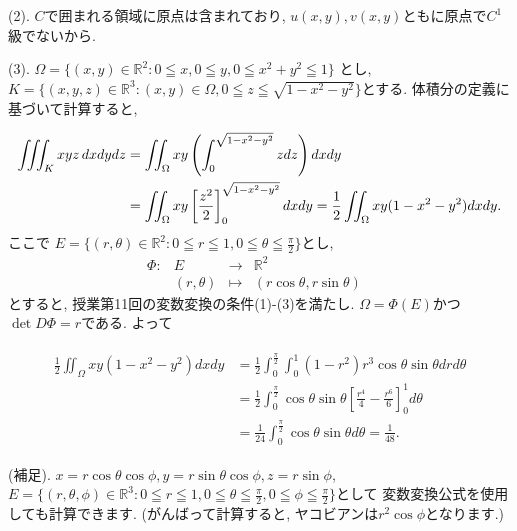 \documentclass[dvipdfmx,a4paper,11pt]{article}
\newcommand{\R}{\mathbb{R}}
\theoremstyle{definition}
\begin{document}
  (2). $C$で囲まれる領域に原点は含まれており, $u(x,y),v(x,y)$ともに原点で$C^1$級でないから. 

(3).
$\Omega= \{ (x,y) \in \R^2 : 0 \leqq x,  0 \leqq y, 
0 \leqq x^2 + y^2  \leqq 1 \}$
とし, 
$K=\{ (x,y,z) \in \R^3 : (x,y) \in \Omega,  0 \leqq z \leqq \sqrt{1-x^2-y^2}\}$とする.
体積分の定義に基づいて計算すると, 

\begin{align*}
\begin{split}
\iiint_{K} xyz \text{\,}dxdydz
&= \iint_{\Omega} xy
\left( \int_{0}^{\sqrt{1-x^2-y^2}} z dz \right) dxdy\\
&= \iint_{\Omega} xy\left[ \frac{z^2}{2} \right]_{0}^{\sqrt{1-x^2-y^2}}dxdy
=\frac{1}{2} \iint_{\Omega} xy(1- x^2-y^2) dxdy. \\
    \end{split}
  \end{align*}
  ここで
   $E= \{ (r ,\theta) \in \R^2 : 0 \leqq r \leqq 1, 
0 \leqq \theta  \leqq\frac{\pi}{2}\}$とし, 
 $$
\begin{array}{ccccc}
\Phi: &E & \rightarrow & \R^2 & \\
&(r,\theta) & \longmapsto & (r \cos \theta , r \sin \theta)&
\end{array}
$$
とすると, 授業第11回の変数変換の条件(1)-(3)を満たし. $\Omega = \Phi(E)$かつ$\det D\Phi =r$である.
 よって
 
 \begin{align*}
\begin{split}
\frac{1}{2} \iint_{\Omega} xy(1- x^2-y^2) dxdy
&= \frac{1}{2} \int_{0}^{\frac{\pi}{2}} \int_{0}^{1}
(1-r^2)r^3 \cos \theta \sin \theta drd\theta \\
&= \frac{1}{2} \int_{0}^{\frac{\pi}{2}} \cos \theta \sin \theta  \left[ \frac{r^4}{4} - \frac{r^6}{6}\right]_{0}^{1}d\theta \\
&= \frac{1}{24}\int_{0}^{\frac{\pi}{2}} \cos \theta \sin \theta d\theta  = \frac{1}{48}.
    \end{split}
  \end{align*}
  
 
  (補足).
   $x=r \cos \theta\cos \phi, y=r \sin \theta \cos \phi, z = r \sin \phi$, 
 $E= \{ (r,\theta,\phi ) \in \R^3 : 0 \leqq r \leqq 1,  0 \leqq \theta \leqq \frac{\pi}{2}, 
0 \leqq \phi \leqq \frac{\pi}{2} \}$として
 変数変換公式を使用しても計算できます.
 (がんばって計算すると, ヤコビアンは$r^2 \cos \phi$となります.)
 
   \vspace{33pt}
   
\end{document}
